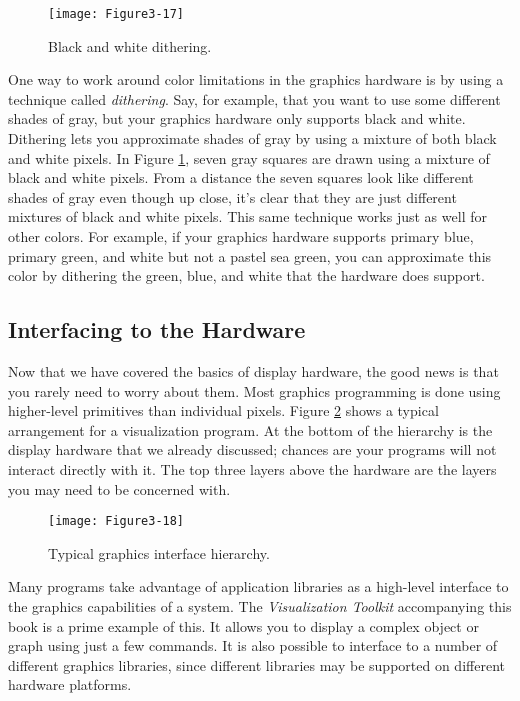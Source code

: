 \begin{figure}[!htb]
  \centering
  \texttt{[image: Figure3-17]}\\
  \caption{Black and white dithering.}\label{fig:Figure3-17}
\end{figure}

One way to work around color limitations in the graphics hardware is by using a technique called \emph{dithering}. Say, for example, that you want to use some different shades of gray, but your graphics hardware only supports black and white. Dithering lets you approximate shades of gray by using a mixture of both black and white pixels. In Figure \ref{fig:Figure3-17}, seven gray squares are drawn using a mixture of black and white pixels. From a distance the seven squares look like different shades of gray even though up close, it's clear that they are just different mixtures of black and white pixels. This same technique works just as well for other colors. For example, if your graphics hardware supports primary blue, primary green, and white but not a pastel sea green, you can approximate this color by dithering the green, blue, and white that the hardware does support.


\subsection{Interfacing to the Hardware}

Now that we have covered the basics of display hardware, the good news is that you rarely need to worry about them. Most graphics programming is done using higher-level primitives than individual pixels. Figure \ref{fig:Figure3-18} shows a typical arrangement for a visualization program. At the bottom of the hierarchy is the display hardware that we already discussed; chances are your programs will not interact directly with it. The top three layers above the hardware are the layers you may need to be concerned with.

\begin{figure}[!htb]
  \centering
  \texttt{[image: Figure3-18]}\\
  \caption{Typical graphics interface hierarchy.}\label{fig:Figure3-18}
\end{figure}

Many programs take advantage of application libraries as a high-level interface to the graphics capabilities of a system. The \emph{Visualization Toolkit} accompanying this book is a prime example of this. It allows you to display a complex object or graph using just a few commands. It is also possible to interface to a number of different graphics libraries, since different libraries may be supported on different hardware platforms.

